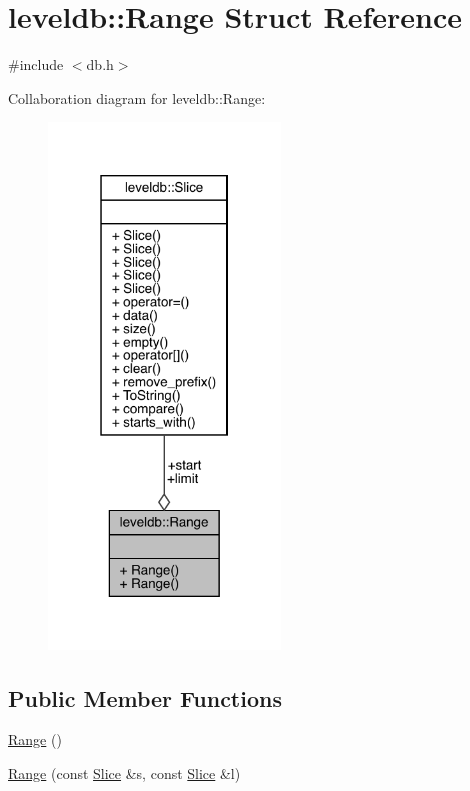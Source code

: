 \hypertarget{structleveldb_1_1_range}{}\section{leveldb\+::Range Struct Reference}
\label{structleveldb_1_1_range}


{\ttfamily \#include $<$db.\+h$>$}



Collaboration diagram for leveldb\+::Range\+:
\nopagebreak
\begin{figure}[H]
\begin{center}
\leavevmode
\includegraphics[width=175pt]{structleveldb_1_1_range__coll__graph}
\end{center}
\end{figure}
\subsection*{Public Member Functions}
\begin{DoxyCompactItemize}
\item 
\mbox{\hyperlink{structleveldb_1_1_range_af73eb85edfde053ebc456cb08f4d3ec1}{Range}} ()
\item 
\mbox{\hyperlink{structleveldb_1_1_range_a797d5e3b58cc615dfb805965d06bdcbf}{Range}} (const \mbox{\hyperlink{classleveldb_1_1_slice}{Slice}} \&s, const \mbox{\hyperlink{classleveldb_1_1_slice}{Slice}} \&l)
\end{DoxyCompactItemize}

